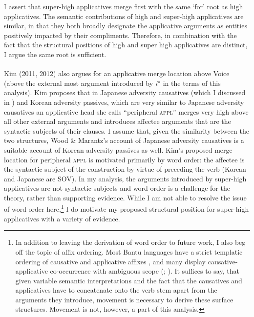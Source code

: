 \documentclass[output=paper,modfonts,nonflat]{langsci/langscibook}
\begin{document}
\begin{styleDefault}
I assert that super-high applicatives merge first with the same ‘for’ root as high applicatives. The semantic contributions of high and super-high applicatives are similar, in that they both broadly designate the applicative arguments as entities positively impacted by their compliments. Therefore, in combination with the fact that the structural positions of high and super high applicatives are distinct, I argue the same root is sufficient.\\
\\
Kim (2011, 2012) also argues for an applicative merge location above Voice (above the external most argument introduced by \textit{i}* in the terms of this analysis). Kim proposes that in Japanese adversity causatives (which I discussed in ) and Korean adversity passives, which are very similar to Japanese adversity causatives an applicative head she calls “peripheral \textsc{appl}” merges very high above all other external arguments and introduces affectee arguments that are the syntactic subjects of their clauses. I assume that, given the similarity between the two structures, Wood \& Marantz’s account of Japanese adversity causatives is a suitable account of Korean adversity passives as well. Kim’s proposed merge location for peripheral \textsc{appl} is motivated primarily by word order: the affectee is the syntactic subject of the construction by virtue of preceding the verb (Korean and Japanese are SOV). In my analysis, the arguments introduced by super-high applicatives are not syntactic subjects and word order is a challenge for the theory, rather than supporting evidence. While I am not able to resolve the issue of word order here,\footnote{In addition to leaving the derivation of word order to future work, I also beg off the topic of affix ordering. Most Bantu languages have a strict templatic ordering of causative and applicative affixes \citep{Good2005}, and many display causative-applicative co-occurrence with ambiguous scope (\citealt{Baker1985}; \citealt{Hyman2002}). It suffices to say, that given variable semantic interpretations and the fact that the causatives and applicatives have to concatenate onto the verb stem apart from the arguments they introduce, movement is necessary to derive these surface structures. Movement is not, however, a part of this analysis.}  I do motivate my proposed structural position for super-high applicatives with a variety of evidence. 
\end{styleDefault}
\end{document}
